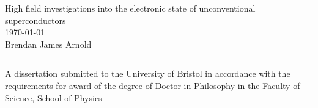 \thispagestyle{empty}

\begin{titlepage}
\begin{center}

\vspace*{4\baselineskip}

{\LARGE High field investigations into the electronic state of unconventional superconductors} \\
[1cm]
{\Large \today} \\
[1cm]
{\Large Brendan James Arnold} \\

\vfill

\rule{\linewidth}{0.2mm}
\end{center}
\begin{singlespace}
A dissertation submitted to the University of Bristol in accordance with the requirements for award of the degree of Doctor in Philosophy in the Faculty of Science, School of Physics
\end{singlespace}

\end{titlepage}


 

